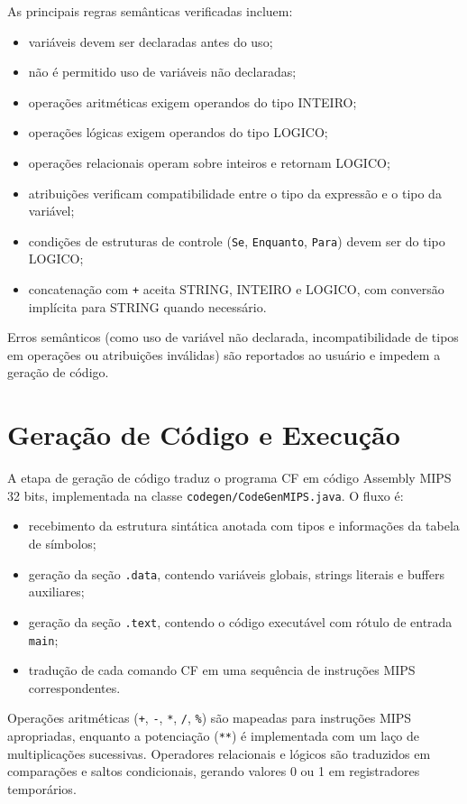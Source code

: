 \documentclass[12pt,a4paper]{article}
\begin{document}
As principais regras semânticas verificadas incluem:

\begin{itemize}
  \item variáveis devem ser declaradas antes do uso;
  \item não é permitido uso de variáveis não declaradas;
  \item operações aritméticas exigem operandos do tipo INTEIRO;
  \item operações lógicas exigem operandos do tipo LOGICO;
  \item operações relacionais operam sobre inteiros e retornam LOGICO;
  \item atribuições verificam compatibilidade entre o tipo da expressão e o tipo da variável;
  \item condições de estruturas de controle (\texttt{Se}, \texttt{Enquanto}, \texttt{Para}) devem ser do tipo LOGICO;
  \item concatenação com \texttt{+} aceita STRING, INTEIRO e LOGICO, com conversão implícita para STRING quando necessário.
\end{itemize}

Erros semânticos (como uso de variável não declarada, incompatibilidade de tipos em operações ou atribuições inválidas) são reportados ao usuário e impedem a geração de código.

\section{Geração de Código e Execução}
\label{sec:codegen}

A etapa de geração de código traduz o programa CF em código Assembly MIPS 32 bits, implementada na classe \texttt{codegen/CodeGenMIPS.java}. O fluxo é:

\begin{itemize}
  \item recebimento da estrutura sintática anotada com tipos e informações da tabela de símbolos;
  \item geração da seção \texttt{.data}, contendo variáveis globais, strings literais e buffers auxiliares;
  \item geração da seção \texttt{.text}, contendo o código executável com rótulo de entrada \texttt{main};
  \item tradução de cada comando CF em uma sequência de instruções MIPS correspondentes.
\end{itemize}

Operações aritméticas (\texttt{+}, \texttt{-}, \texttt{*}, \texttt{/}, \texttt{\%}) são mapeadas para instruções MIPS apropriadas, enquanto a potenciação (\texttt{**}) é implementada com um laço de multiplicações sucessivas. Operadores relacionais e lógicos são traduzidos em comparações e saltos condicionais, gerando valores 0 ou 1 em registradores temporários.
\end{document}
